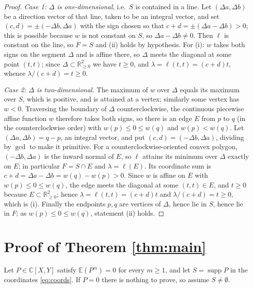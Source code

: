 \documentclass[11pt]{amsart}
\theoremstyle{plain}
\theoremstyle{remark}
\numberwithin{equation}{section}
\DeclareMathOperator{\supp}{supp}
\newcommand{\C}{\mathbb{C}}
\newcommand{\E}{\mathbb{E}}
\begin{document}
\begin{proof}
\emph{Case 1: $\Delta$ is one-dimensional}, i.e.\ $S$ is contained in a line.
Let $(\Delta a,\Delta b)$ be a direction vector of that line, taken to be an
integral vector, and set $(c,d)=\pm(-\Delta b,\Delta a)$ with the sign chosen so
that $c+d=\pm(\Delta a-\Delta b)>0$; this is possible because $w$ is not
constant on $S$, so $\Delta a-\Delta b\ne0$. Then $\ell$ is constant on the
line, so $F=S$ and (ii) holds by hypothesis. For (i): $w$ takes both signs on
the segment $\Delta$ and is affine there, so $\Delta$ meets the diagonal at some
point $(t,t)$; since $\Delta\subset\mathbb R_{\ge0}^2$ we have $t\ge0$, and
$\lambda=\ell(t,t)=(c+d)t$, whence $\lambda/(c+d)=t\ge0$.

\emph{Case 2: $\Delta$ is two-dimensional.} The maximum of $w$ over $\Delta$
equals its maximum over $S$, which is positive, and is attained at a vertex;
similarly some vertex has $w<0$. Traversing the boundary of $\Delta$
counterclockwise, the continuous piecewise affine function $w$ therefore takes
both signs, so there is an edge $E$ from $p$ to $q$ (in the counterclockwise
order) with $w(p)\le0\le w(q)$ and $w(p)<w(q)$. Let
$(\Delta a,\Delta b)=q-p$, an integral vector, and put
$(c,d)=(-\Delta b,\Delta a)$, dividing by $\gcd$ to make it primitive. For a
counterclockwise-oriented convex polygon, $(-\Delta b,\Delta a)$ is the inward
normal of $E$, so $\ell$ attains its minimum over $\Delta$ exactly on $E$; in
particular $F=S\cap E$ and $\lambda=\ell(E)$. Its coordinate sum is
$c+d=\Delta a-\Delta b=w(q)-w(p)>0$. Since $w$ is affine on $E$ with
$w(p)\le0\le w(q)$, the edge meets the diagonal at some $(t,t)\in E$, and
$t\ge0$ because $E\subset\mathbb R_{\ge0}^2$; hence
$\lambda=\ell(t,t)=(c+d)t$ and $\lambda/(c+d)=t\ge0$, which is (i). Finally the
endpoints $p,q$ are vertices of $\Delta$, hence lie in $S$, hence lie in $F$;
as $w(p)\le0\le w(q)$, statement (ii) holds.
\end{proof}

\section{Proof of Theorem \ref{thm:main}}\label{sec:proof}

Let $P\in\C[X,Y]$ satisfy $\E(P^m)=0$ for every $m\ge1$, and let $S=\supp P$ in
the coordinates \eqref{eq:coords}. If $P=0$ there is nothing to prove, so assume
$S\ne\emptyset$.
\end{document}
